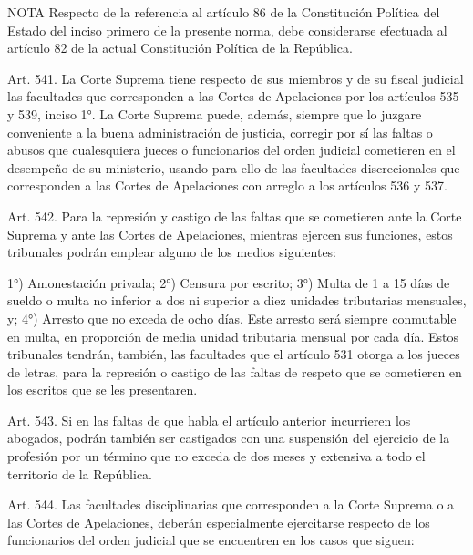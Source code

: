 NOTA
      Respecto de la referencia al artículo 86 de la Constitución Política del Estado del inciso primero de la presente norma, debe considerarse efectuada al artículo 82 de la actual Constitución Política de la República.

    Art. 541. La Corte Suprema tiene respecto de sus miembros y de su fiscal judicial las facultades que corresponden a las Cortes de Apelaciones por los artículos 535 y 539, inciso 1°.
    La Corte Suprema puede, además, siempre que lo juzgare conveniente a la buena administración de justicia, corregir por sí las faltas o abusos que cualesquiera jueces o funcionarios del orden judicial cometieren en el desempeño de su ministerio, usando para ello de las facultades discrecionales que corresponden a las Cortes de Apelaciones con arreglo a los artículos 536 y 537.


    Art. 542. Para la represión y castigo de las faltas que se cometieren ante la Corte Suprema y ante las Cortes de Apelaciones, mientras ejercen sus funciones, estos tribunales podrán emplear alguno de los medios siguientes:

    1°) Amonestación privada;
    2°) Censura por escrito;
    3°) Multa de 1 a 15 días de sueldo o multa no inferior a dos ni superior a diez unidades tributarias mensuales, y;
    4°) Arresto que no exceda de ocho días.
    Este arresto será siempre conmutable en multa, en proporción de media unidad tributaria mensual por cada día.
    Estos tribunales tendrán, también, las facultades que el artículo 531 otorga a los jueces de letras, para la represión o castigo de las faltas de respeto que se cometieren en los escritos que se les presentaren.



    Art. 543. Si en las faltas de que habla el artículo anterior incurrieren los abogados, podrán también ser castigados con una suspensión del ejercicio de la profesión por un término que no exceda de dos meses y extensiva a todo el territorio de la República.


    Art. 544. Las facultades disciplinarias que corresponden a la Corte Suprema o a las Cortes de Apelaciones, deberán especialmente ejercitarse respecto de los funcionarios del orden judicial que se encuentren en los casos que siguen:

